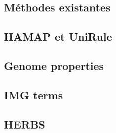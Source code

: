 \begin{refsection}
    \section{Méthodes existantes}
    \subsection{HAMAP et UniRule}
    \subsection{Genome properties}
    \subsection{IMG terms}
    \subsection{HERBS}
    
    \subbibliography
\end{refsection}